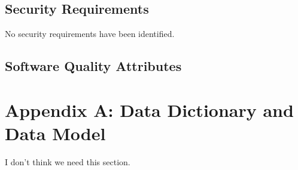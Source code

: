 \documentclass[pdftex,12pt,letter]{article}
\begin{document}
\subsection{Security Requirements}
No security requirements have been identified.
\subsection{Software Quality Attributes}

\section*{Appendix A: Data Dictionary and Data Model}
I don't think we need this section.
\end{document}
